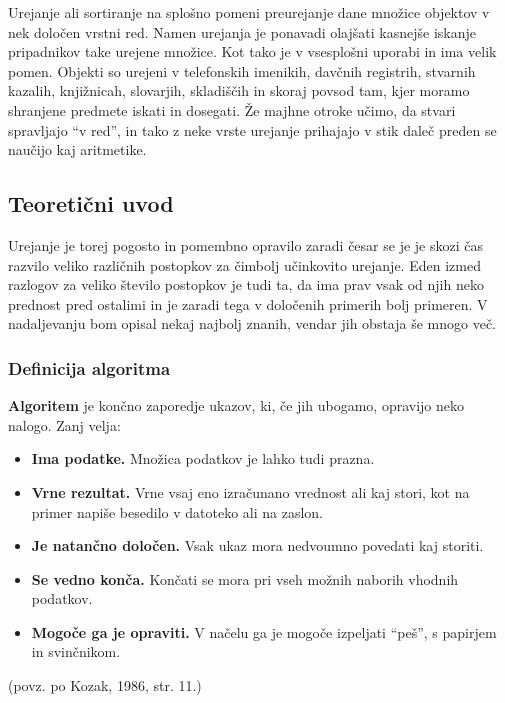 \documentclass[a4paper,oneside,12pt]{article}
\begin{document}
Urejanje ali sortiranje na splošno pomeni preurejanje dane množice objektov
v nek določen vrstni red.
Namen urejanja je ponavadi olajšati kasnejše iskanje pripadnikov take urejene množice. Kot tako je
v vsesplošni uporabi in ima velik pomen. Objekti so urejeni v telefonskih imenikih,
davčnih registrih, stvarnih kazalih, knjižnicah, slovarjih, skladiščih in skoraj povsod tam,
kjer moramo shranjene predmete iskati in dosegati. Že majhne otroke učimo, da stvari spravljajo
``v red'', in tako z neke vrste urejanje prihajajo v stik daleč preden se naučijo kaj
aritmetike.

\subsection{Teoretični uvod}
\label{chapter:teoreticni}
Urejanje je torej pogosto in pomembno opravilo zaradi česar se je je skozi čas
razvilo veliko različnih postopkov za čimbolj učinkovito urejanje. Eden izmed razlogov za
veliko število postopkov je tudi ta, da ima prav vsak od njih neko prednost pred ostalimi in je
zaradi tega v določenih primerih bolj primeren. V nadaljevanju bom opisal nekaj najbolj znanih, 
vendar jih obstaja še mnogo več. 

\subsubsection{Definicija algoritma}

\begin{definicija}
\textbf{Algoritem} je končno zaporedje ukazov, ki, če jih ubogamo, opravijo neko nalogo.
Zanj velja:
\begin{itemize}
  \item \textbf{Ima podatke.} Množica podatkov je lahko tudi prazna.
  \item \textbf{Vrne rezultat.} Vrne vsaj eno izračunano vrednost ali kaj stori, kot na primer
    napiše besedilo v datoteko ali na zaslon.
  \item \textbf{Je natančno določen.} Vsak ukaz mora nedvoumno povedati kaj storiti.
  \item \textbf{Se vedno konča.} Končati se mora pri vseh možnih naborih vhodnih podatkov.
  \item \textbf{Mogoče ga je opraviti.} V načelu ga je mogoče izpeljati ``peš'', s papirjem in
    svinčnikom.
\end{itemize}
\end{definicija}
(povz. po Kozak, 1986, str. 11.)
\end{document}
